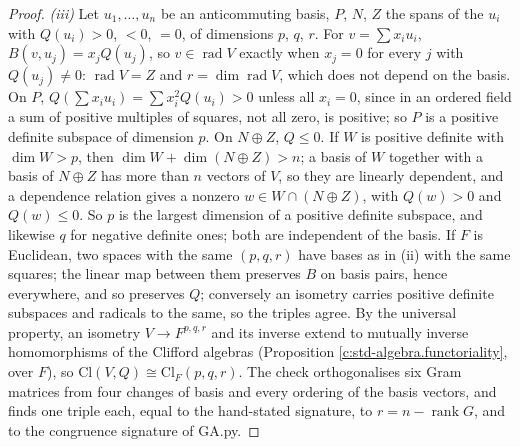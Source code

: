 \documentclass[11pt]{article}
\theoremstyle{definition}
\theoremstyle{plain}
\providecommand{\Cl}{}\renewcommand{\Cl}{\mathrm{Cl}}
\begin{document}
\begin{proof}
\emph{(iii)} Let $u_{1}, \dots, u_{n}$ be an anticommuting basis, $P$, $N$, $Z$ the spans of the $u_{i}$ with $Q(u_{i}) > 0$, $< 0$, $= 0$, of dimensions $p$, $q$, $r$. For $v = \sum x_{i}u_{i}$, $B(v, u_{j}) = x_{j}Q(u_{j})$, so $v \in \operatorname{rad} V$ exactly when $x_{j} = 0$ for every $j$ with $Q(u_{j}) \ne 0$: $\operatorname{rad} V = Z$ and $r = \dim \operatorname{rad} V$, which does not depend on the basis. On $P$, $Q(\sum x_{i}u_{i}) = \sum x_{i}^{2}Q(u_{i}) > 0$ unless all $x_{i} = 0$, since in an ordered field a sum of positive multiples of squares, not all zero, is positive; so $P$ is a positive definite subspace of dimension $p$. On $N \oplus Z$, $Q \le 0$. If $W$ is positive definite with $\dim W > p$, then $\dim W + \dim(N \oplus Z) > n$; a basis of $W$ together with a basis of $N \oplus Z$ has more than $n$ vectors of $V$, so they are linearly dependent, and a dependence relation gives a nonzero $w \in W \cap (N \oplus Z)$, with $Q(w) > 0$ and $Q(w) \le 0$. So $p$ is the largest dimension of a positive definite subspace, and likewise $q$ for negative definite ones; both are independent of the basis. If $F$ is Euclidean, two spaces with the same $(p, q, r)$ have bases as in (ii) with the same squares; the linear map between them preserves $B$ on basis pairs, hence everywhere, and so preserves $Q$; conversely an isometry carries positive definite subspaces and radicals to the same, so the triples agree. By the universal property, an isometry $V \to F^{p,q,r}$ and its inverse extend to mutually inverse homomorphisms of the Clifford algebras (Proposition \ref{c:std-algebra.functoriality}, over $F$), so $\Cl(V, Q) \cong \Cl_{F}(p,q,r)$. The check orthogonalises six Gram matrices from four changes of basis and every ordering of the basis vectors, and finds one triple each, equal to the hand-stated signature, to $r = n - \operatorname{rank} G$, and to the congruence signature of GA.py.


\end{proof}
\end{document}

